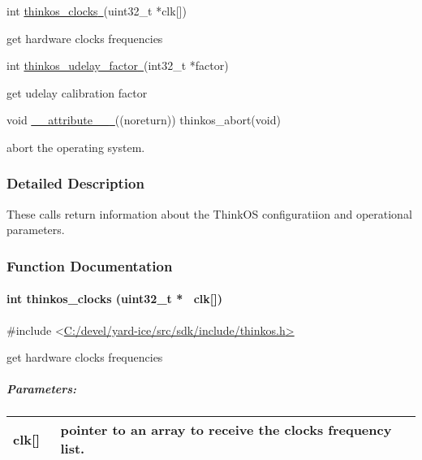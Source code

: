 {{int
}{\protect\hyperlink{h.34g0dwd}{thinkos\_clocks}}{\protect\hyperlink{h.34g0dwd}{~}}{(uint32\_t
*clk{[}{]})}

{get hardware clocks frequencies }

{int
}{\protect\hyperlink{h.1jlao46}{thinkos\_udelay\_factor}}{\protect\hyperlink{h.1jlao46}{~}}{(int32\_t
*factor)}

{get udelay calibration factor }

{void
}{\protect\hyperlink{h.43ky6rz}{\_\_attribute\_\_}}{\protect\hyperlink{h.43ky6rz}{~}}{((noreturn))
thinkos\_abort(void)}

{abort the operating system. }

{}

\subsubsection{\texorpdfstring{{Detailed
Description}}{Detailed Description}}\label{detailed-description-9}

{These calls return information about the ThinkOS configuratiion and
operational parameters. }

{}

\subsubsection{\texorpdfstring{{Function
Documentation}}{Function Documentation}}\label{function-documentation-9}

\paragraph{\texorpdfstring{{int thinkos\_clocks (uint32\_t *
~clk{[}{]})}}{int thinkos\_clocks (uint32\_t * ~clk{[}{]})}}\label{int-thinkos_clocks-uint32_t-clk}

{}

{\#include
\textless{}}{\protect\hyperlink{h.pkwqa1}{C:/devel/yard-ice/src/sdk/include/thinkos.h}}{\protect\hyperlink{h.pkwqa1}{\textgreater{}}}

{get hardware clocks frequencies }

{}

\subparagraph{\texorpdfstring{{Parameters:}}{Parameters:}}\label{parameters-50}

\protect\hypertarget{t.866b9b535e5516e27514680fa2775da750ad842a}{}{}\protect\hypertarget{t.51}{}{}

\begin{longtable}[]{@{}ll@{}}
\toprule
\begin{minipage}[t]{0.47\columnwidth}\raggedright\strut
{clk{[}{]}}{~}\strut
\end{minipage} & \begin{minipage}[t]{0.47\columnwidth}\raggedright\strut
{pointer to an array to receive the clocks frequency list. }\strut
\end{minipage}\tabularnewline
\bottomrule
\end{longtable}

}
